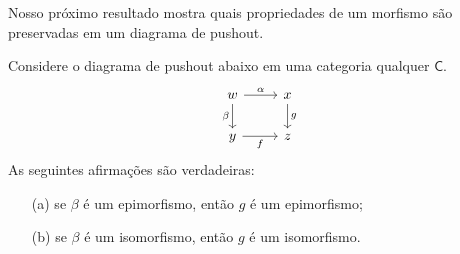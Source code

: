 Nosso próximo resultado mostra quais propriedades de um morfismo são preservadas em um diagrama de pushout.

\begin{teo}\label{teo:props_preservadas_pushout}
    Considere o diagrama de pushout abaixo em uma categoria qualquer $\mathsf{C}$.
    \begin{displaymath}
        \begin{tikzcd}
            w
            \arrow[r, "\alpha"]
            \arrow[d, "\beta" swap]
            & x
            \arrow[d, "g"]
            \\ y
            \arrow[r, "f" swap]
            & z
        \end{tikzcd}
    \end{displaymath}
    As seguintes afirmações são verdadeiras:
    \begin{enumerate}
        \item[(a)] se $\beta$ é um epimorfismo, então $g$ é um epimorfismo;

        \item[(b)] se $\beta$ é um isomorfismo, então $g$ é um isomorfismo.
    \end{enumerate}
\end{teo}


